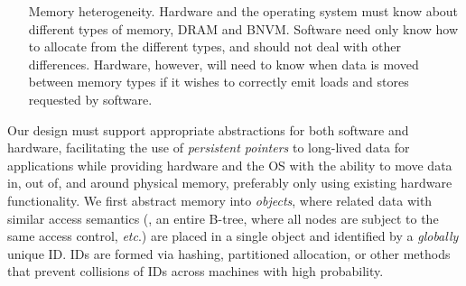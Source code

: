 {\begin{enumerate}
                persistent pointer into a physical address.
                This mapping may change frequently as the OS changes allocation of physical
                pages to data (\eg, to persist a piece of data).
                Hardware need only know
                how to access data in memory
                for a single operation. In contrast, software must have longer-term mappings, and must
                be able to support data shared between threads, potentially mapped into the threads
                in different places.
            \item[Memory heterogeneity.] Hardware and the operating system must know about different
                types of memory, \eg DRAM and BNVM.
                Software need only know how to allocate
                from the different types, and should not deal with other differences. Hardware, however,
                will need to know when data is moved between memory types if it wishes to correctly emit loads and stores
                requested by software.
        \end{enumerate}

        Our design must support appropriate abstractions for both software and hardware, facilitating the
        use of \emph{persistent pointers} to long-lived data for applications while providing hardware and
        the OS with the ability to move data in, out of, and around physical memory, preferably only using
        existing hardware functionality. We first abstract memory into \emph{objects},
        where related data with similar access semantics (\eg, an entire B-tree, where all nodes are subject
        to the same access control, \emph{etc}.) are placed in a single object and identified by
        a \emph{globally} unique ID. IDs are formed via hashing, partitioned allocation, or other methods that prevent collisions
        of IDs across machines with high probability.

}
